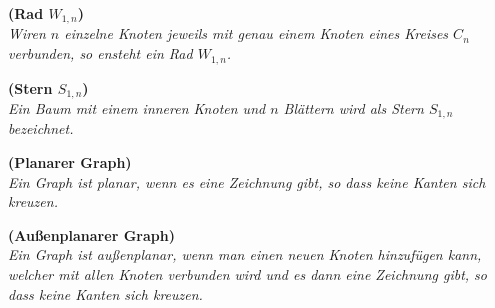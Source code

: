 \begin{defi}{\textbf{(Rad $W_{1,n}$)}}\\
\emph{Wiren $n$ einzelne Knoten jeweils mit genau einem Knoten eines Kreises $C_n$ verbunden, so ensteht ein Rad $W_{1,n}$.} \end{defi}


\begin{defi}{\textbf{(Stern $S_{1,n}$)}}\\
\label{defstern}
\emph{Ein Baum mit einem inneren Knoten und $n$ Blättern wird als Stern $S_{1,n}$ bezeichnet.} \end{defi}

\begin{defi}{\textbf{(Planarer Graph)}}\\
\emph{Ein Graph ist planar, wenn es eine Zeichnung gibt, so dass keine Kanten sich kreuzen.} \end{defi}


\begin{defi}{\textbf{(Außenplanarer Graph)}}\\
\emph{Ein Graph ist außenplanar, wenn man einen neuen Knoten hinzufügen kann, welcher mit allen Knoten verbunden wird und es dann eine Zeichnung gibt, so dass keine Kanten sich kreuzen.} 
\end{defi}


